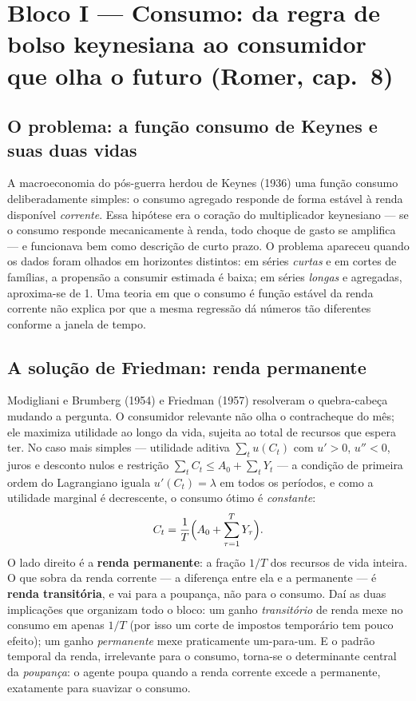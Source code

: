 \documentclass[12pt, a4paper]{article}
\begin{document}
\section{Bloco I --- Consumo: da regra de bolso keynesiana ao consumidor que olha o futuro (Romer, cap.\ 8)}

\subsection{O problema: a função consumo de Keynes e suas duas vidas}

A macroeconomia do pós-guerra herdou de Keynes (1936) uma função consumo
deliberadamente simples: o consumo agregado responde de forma estável à renda
disponível \emph{corrente}. Essa hipótese era o coração do multiplicador
keynesiano --- se o consumo responde mecanicamente à renda, todo choque de
gasto se amplifica --- e funcionava bem como descrição de curto prazo. O
problema apareceu quando os dados foram olhados em horizontes distintos: em
séries \emph{curtas} e em cortes de famílias, a propensão a consumir estimada
é baixa; em séries \emph{longas} e agregadas, aproxima-se de 1. Uma teoria em
que o consumo é função estável da renda corrente não explica por que a mesma
regressão dá números tão diferentes conforme a janela de tempo.

\subsection{A solução de Friedman: renda permanente}

Modigliani e Brumberg (1954) e Friedman (1957) resolveram o quebra-cabeça
mudando a pergunta. O consumidor relevante não olha o contracheque do mês; ele
maximiza utilidade ao longo da vida, sujeita ao total de recursos que espera
ter. No caso mais simples --- utilidade aditiva $\sum_t u(C_t)$ com $u'>0$,
$u''<0$, juros e desconto nulos e restrição
$\sum_t C_t \leq A_0 + \sum_t Y_t$ --- a condição de primeira ordem do
Lagrangiano iguala $u'(C_t) = \lambda$ em todos os períodos, e como a utilidade
marginal é decrescente, o consumo ótimo é \emph{constante}:
\[
C_t = \frac{1}{T}\Bigl(A_0 + \sum_{\tau=1}^{T} Y_\tau\Bigr).
\]
O lado direito é a \textbf{renda permanente}: a fração $1/T$ dos recursos de
vida inteira. O que sobra da renda corrente --- a diferença entre ela e a
permanente --- é \textbf{renda transitória}, e vai para a poupança, não para o
consumo. Daí as duas implicações que organizam todo o bloco: um ganho
\emph{transitório} de renda mexe no consumo em apenas $1/T$ (por isso um corte
de impostos temporário tem pouco efeito); um ganho \emph{permanente} mexe
praticamente um-para-um. E o padrão temporal da renda, irrelevante para o
consumo, torna-se o determinante central da \emph{poupança}: o agente poupa
quando a renda corrente excede a permanente, exatamente para suavizar o
consumo.
\end{document}
